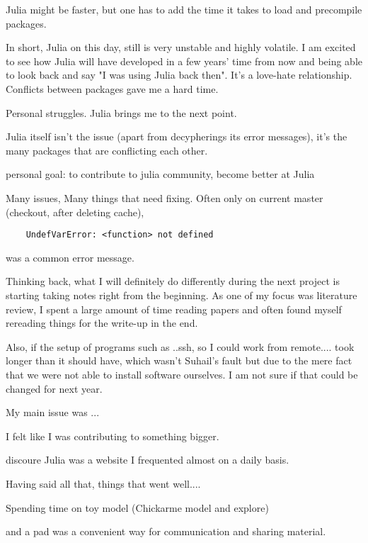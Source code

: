 \documentclass[journal, a4paper]{IEEEtran}
\begin{document}
Julia might be faster, but one has to add the time it takes to load and precompile packages.

In short, Julia on this day, still is very unstable and highly volatile. I am excited to see how Julia will have developed in a few years' time from now and being able to look back and say "I was using Julia back then". It's a love-hate relationship. 
Conflicts between packages gave me a hard time. 

Personal struggles.
Julia brings me to the next point. 

Julia itself isn't the issue (apart from decypherings its error messages), it's the many packages that are conflicting each other.


personal goal: to contribute to julia community, become better at Julia


Many issues, Many things that need fixing.
Often only on current master (checkout, after deleting cache), \begin{verbatim}
	UndefVarError: <function> not defined
\end{verbatim}
was a common error message.

Thinking back, what I will definitely do differently during the next project is starting taking notes right from the beginning. As one of my focus was literature review, I spent a large amount of time reading papers and often found myself rereading things for the write-up in the end.


Also, if the setup of programs such as ..ssh, so I could work from remote.... took longer than it should have, which wasn't Suhail's fault but due to the mere fact that we were not able to install software ourselves. I am not sure if that could be changed for next year. 

My main issue was ...

I felt like I was contributing to something bigger.

discoure Julia was a website I frequented almost on a daily basis. 



Having said all that, things that went well....


Spending time on toy model (Chickarme model and explore)



and a pad was a convenient way for communication and sharing material. 
\end{document}

